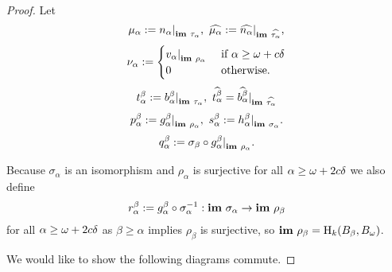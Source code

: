 \begin{proof}
  Let
  \[ \mu_\alpha := n_\alpha\mathord{\mid}_{\mathbf{im}~\tau_\alpha},\ \widehat{\mu_\alpha} := \widehat{n_\alpha}\mathord{\mid}_{\mathbf{im}~\widehat{\tau_\alpha}},\]
  \[ \nu_\alpha := \begin{cases} v_\alpha\mathord{\mid}_{\mathbf{im}~\rho_\alpha}&\text{ if } \alpha\geq \omega+c{\delta}\\ 0&\text{ otherwise.}\end{cases}\]
  \[ t_\alpha^\beta := b_\alpha^\beta\mathord{\mid}_{\mathbf{im}~\tau_\alpha},\ \widehat{t_\alpha^\beta} = \widehat{b_\alpha^\beta}\mathord{\mid}_{\mathbf{im}~\widehat{\tau_\alpha}}\]
  \[ p_\alpha^\beta := g_\alpha^\beta\mathord{\mid}_{\mathbf{im}~\rho_\alpha},\ s_\alpha^\beta := h_\alpha^\beta\mathord{\mid}_{\mathbf{im}~\sigma_\alpha}.\]
  \[q_\alpha^\beta := \sigma_\beta\circ g_\alpha^\beta\mathord{\mid}_{\mathbf{im}~\rho_\alpha}.\] %

  Because $\sigma_\alpha$ is an isomorphism and $\rho_\alpha$ is surjective for all $\alpha\geq\omega+2c{\delta}$ we also define
  \[ r_\alpha^\beta := g_\alpha^\beta\circ\sigma_\alpha^{-1} : \mathbf{im}~\sigma_\alpha\to \mathbf{im}~\rho_\beta \]
  for all $\alpha\geq\omega+2c{\delta}$ as $\beta\geq\alpha$ implies $\rho_\beta$ is surjective, so $\mathbf{im}~\rho_\beta = \mathrm{H}_k(B_\beta, B_{\omega})$.

  We would like to show the following diagrams commute.


\end{proof}
